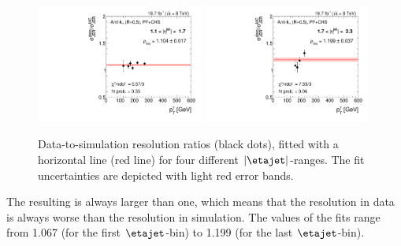 \begin{figure}[!t]
    \includegraphics[width=0.49\textwidth]{figures/resolution/results/Ratio_Resolution_for_3_eta_bin_PFCHS_data_comparison_RMS99.pdf}
    \includegraphics[width=0.49\textwidth]{figures/resolution/results/Ratio_Resolution_for_4_eta_bin_PFCHS_data_comparison_RMS99.pdf}
  \caption{Data-to-simulation resolution ratios \rhores (black dots), fitted with a horizontal line (red line) for four different $|\etajet|$-ranges.
           The fit uncertainties are depicted with light red error bands.}
  \label{res:fig:RatioEtaBinned}
\end{figure}

The resulting \rhores is always larger than one, which means that the resolution in data is always worse than the resolution in simulation.
The values of the fits range from 1.067 (for the first $\etajet$-bin) to 1.199 (for the last $\etajet$-bin). 

